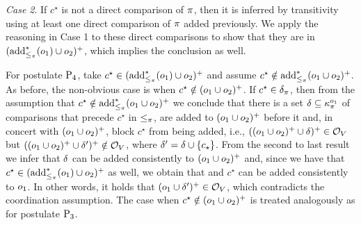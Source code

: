 \begin{prf*}{}{}
	\emph{Case 2}. 
	If $c^\star$ is not a direct comparison of $\pi$, then it is inferred 
	by transitivity using at least one direct comparison of $\pi$ added previously. 
	We apply the reasoning in Case 1 to these direct comparisons to show that they are in 
	$({\operatorname{add}}^\ast_{\le_\pi}(o_1)\cup o_2)^+$, which implies the conclusion as well.
	
	For postulate $\mathrm{P}_{4}$, take $c^\star\in({\operatorname{add}}^\ast_{\le_\pi}(o_1)\cup o_2)^+$
	and assume $c^\star\notin{\operatorname{add}}^\ast_{\le_\pi}(o_1\cup o_2)^+$.
	As before, the non-obvious case is when $c^\star\notin(o_1\cup o_2)^+$.
	If $c^\star\in\delta_\pi$, 
	then from the assumption that $c^\star\notin{\operatorname{add}}^\ast_{\le_\pi}(o_1\cup o_2)^+$
	we conclude that there is a set $\delta\subseteq\kappa_{\pi}^{o_1}$ of comparisons 
	that precede $c^\star$ in $\le_\pi$,
	are added to $(o_1\cup o_2)^+$ before it and, in concert with $(o_1\cup o_2)^+$, 
	block $c^\star$ from being added, i.e., 
	$((o_1\cup o_2)^+\cup\delta)^+\in\mathcal{O}_V$ but
	$((o_1\cup o_2)^+\cup\delta')^+\notin\mathcal{O}_V$,
	where $\delta'=\delta\cup\{c_\star\}$.
	From the second to last result 
	we infer that $\delta$ can be added consistently to $(o_1\cup o_2)^+$
	and, since we have that $c^\star\in({\operatorname{add}}^\ast_{\le_\pi}(o_1)\cup o_2)^+$ as well,
	we obtain that 
	and $c^\star$ can be added consistently to $o_1$.
	In other words, it holds that 
	$(o_1\cup\delta')^+\in\mathcal{O}_V$,
	which contradicts the coordination assumption.
	The case when $c^\star\notin(o_1\cup o_2)^+$ is 
	treated analogously as for postulate $\mathrm{P}_{3}$.
	

\end{prf*}
